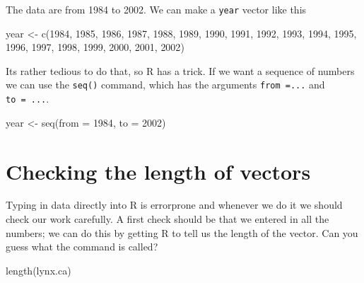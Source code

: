 \documentclass[
]{book}
\newenvironment{Shaded}{\begin{snugshade}}{\end{snugshade}}
\newcommand{\AttributeTok}[1]{\textcolor[rgb]{0.77,0.63,0.00}{#1}}
\newcommand{\DecValTok}[1]{\textcolor[rgb]{0.00,0.00,0.81}{#1}}
\newcommand{\FunctionTok}[1]{\textcolor[rgb]{0.00,0.00,0.00}{#1}}
\newcommand{\NormalTok}[1]{#1}
\newcommand{\OtherTok}[1]{\textcolor[rgb]{0.56,0.35,0.01}{#1}}
\begin{document}
The data are from 1984 to 2002. We can make a \texttt{year} vector like this

\begin{Shaded}
\begin{Highlighting}[]
\NormalTok{year }\OtherTok{\textless{}{-}} \FunctionTok{c}\NormalTok{(}\DecValTok{1984}\NormalTok{, }\DecValTok{1985}\NormalTok{, }\DecValTok{1986}\NormalTok{, }\DecValTok{1987}\NormalTok{,}
          \DecValTok{1988}\NormalTok{, }\DecValTok{1989}\NormalTok{, }\DecValTok{1990}\NormalTok{, }\DecValTok{1991}\NormalTok{, }\DecValTok{1992}\NormalTok{, }
          \DecValTok{1993}\NormalTok{, }\DecValTok{1994}\NormalTok{, }\DecValTok{1995}\NormalTok{, }\DecValTok{1996}\NormalTok{, }\DecValTok{1997}\NormalTok{,}
          \DecValTok{1998}\NormalTok{, }\DecValTok{1999}\NormalTok{, }\DecValTok{2000}\NormalTok{, }\DecValTok{2001}\NormalTok{, }\DecValTok{2002}\NormalTok{)}
\end{Highlighting}
\end{Shaded}

Its rather tedious to do that, so R has a trick. If we want a sequence of numbers we can use the \texttt{seq()} command, which has the arguments \texttt{from\ =...} and \texttt{to\ =\ ...}.

\begin{Shaded}
\begin{Highlighting}[]
\NormalTok{year }\OtherTok{\textless{}{-}} \FunctionTok{seq}\NormalTok{(}\AttributeTok{from =} \DecValTok{1984}\NormalTok{, }\AttributeTok{to =} \DecValTok{2002}\NormalTok{)}
\end{Highlighting}
\end{Shaded}

\hypertarget{checking-the-length-of-vectors}{%
\section{Checking the length of vectors}\label{checking-the-length-of-vectors}}

Typing in data directly into R is errorprone and whenever we do it we should check our work carefully. A first check should be that we entered in all the numbers; we can do this by getting R to tell us the length of the vector. Can you guess what the command is called?

\begin{Shaded}
\begin{Highlighting}[]
\FunctionTok{length}\NormalTok{(lynx.ca)}
\end{Highlighting}
\end{Shaded}
\end{document}
